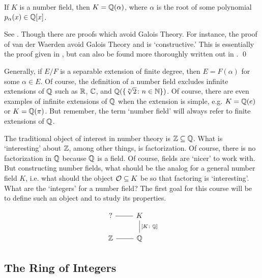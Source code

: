 \begin{thm} \label{thm:primelmthm}
If $K$ is a number field, then $K=\mathbb{Q}(\alpha)$, where $\alpha$ is the root of some polynomial $p_\alpha(x) \in \mathbb{Q}[x]$. 
\end{thm}

\pf See \cite[Ch. 14.4, Thm 25]{dummit}. Though there are proofs which avoid Galois Theory. For instance, the  proof of van der Waerden avoid Galois Theory and is `constructive.' This is essentially the proof given in \cite{murty}, but can also be found more thoroughly written out in \cite{brown}. \qed \pskip


Generally, if $E/F$ is a separable extension of finite degree, then $E=F(\alpha)$ for some $\alpha \in E$. Of course, the definition of a number field excludes infinite extensions of $\mathbb{Q}$ such as $\mathbb{R}$, $\mathbb{C}$, and $\mathbb{Q}(\{\sqrt[n]{2} \colon n \in \mathbb{N}\})$. Of course, there are even examples of infinite extensions of $\mathbb{Q}$ when the extension is simple, e.g. $K=\mathbb{Q}(e)$ or $K=\mathbb{Q}(\pi)$. But remember, the term `number field' will always refer to finite extensions of $\mathbb{Q}$. 


The traditional object of interest in number theory is $\mathbb{Z} \subseteq \mathbb{Q}$. What is `interesting' about $\mathbb{Z}$, among other things, is factorization. Of course, there is no factorization in $\mathbb{Q}$ because $\mathbb{Q}$ is a field. Of course, fields are `nicer' to work with. But constructing number fields, what should be the analog for a general number field $K$, i.e. what should the object $\mathcal{O} \subseteq K$ be so that factoring is `interesting'. What are the `integers' for a number field? The first goal for this course will be to define such an object and to study its properties. 


	\[
	\begin{tikzcd}
	? \arrow[dash]{r} & K \arrow[dash]{d}{[K \colon \Q]} \\
	\Z \arrow[dash]{r} & \Q
	\end{tikzcd}
	\]



\subsection{The Ring of Integers}


